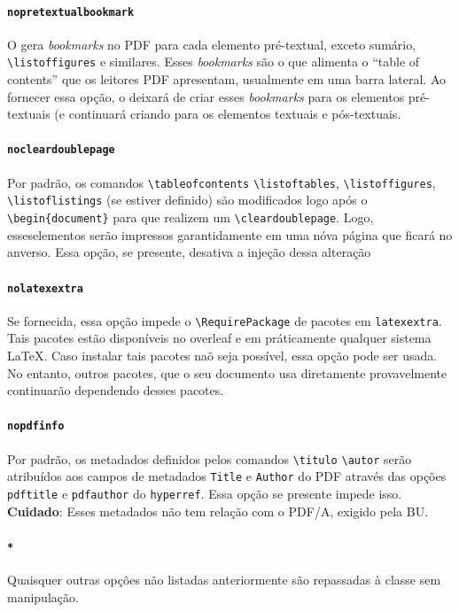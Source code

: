 \documentclass[embeddedlogo]{ufsc-thesis-rn46-2019}
\newcommand{\lacmd}[1]{\texttt{\textbackslash{}#1}}
\begin{document}
\paragraph*{\texttt{nopretextualbookmark}} O \abnTeX{} gera \emph{bookmarks} no
PDF para cada elemento pré-textual, exceto sumário, \lacmd{listoffigures} e
similares. Esses \emph{bookmarks} são o que alimenta o ``table of contents'' que
os leitores PDF apresentam, usualmente em uma barra lateral.  Ao fornecer essa
opção, o \abnTeX{} deixará de criar esses \emph{bookmarks} para os elementos
pré-textuais (e continuará criando para os elementos textuais e pós-textuais.

\paragraph*{\texttt{nocleardoublepage}} Por padrão, os comandos
\lacmd{tableofcontents} \lacmd{listoftables}, \lacmd{listoffigures},
\lacmd{listoflistings} (se estiver definido) são modificados logo após o
\lacmd{begin\{document\}} para que realizem um \lacmd{cleardoublepage}. Logo,
esseselementos serão impressos garantidamente em uma nóva página que ficará no
anverso. Essa opção, se presente, desativa a injeção dessa alteração

\paragraph*{\texttt{nolatexextra}}
Se fornecida, essa opção impede o \lacmd{RequirePackage} de pacotes em \texttt{latexextra}.
Tais pacotes estão disponíveis no overleaf e em práticamente qualquer sistema
\LaTeX. Caso instalar tais pacotes naõ seja possível, essa opção pode ser usada.
No entanto, outros pacotes, que o seu documento usa diretamente provavelmente
continuarão dependendo desses pacotes.

\paragraph*{\texttt{nopdfinfo}} Por padrão, os metadados definidos pelos
comandos \lacmd{titulo} \lacmd{autor} serão atribuídos aos campos de metadados
\texttt{Title} e \texttt{Author} do PDF através das opções \texttt{pdftitle} e
\texttt{pdfauthor} do \texttt{hyperref}. Essa opção se presente impede isso.
\textbf{Cuidado}: Esses metadados não tem relação com o PDF/A, exigido pela BU.

\paragraph*{\texttt{*}} Quaisquer outras opções não listadas anteriormente são
repassadas à classe \abnTeX{} sem manipulação.
\end{document}
